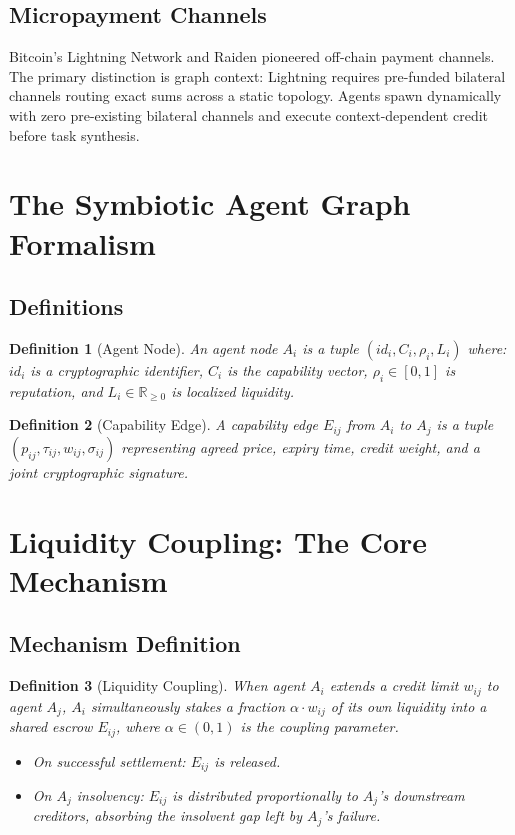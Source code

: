 \documentclass[11pt]{article}
\newtheorem{definition}{Definition}[section]
\begin{document}
\subsection{Micropayment Channels}
Bitcoin's Lightning Network \cite{poon2016lightning} and Raiden \cite{raiden2019} pioneered off-chain payment channels. The primary distinction is graph context: Lightning requires pre-funded bilateral channels routing exact sums across a static topology. Agents spawn dynamically with zero pre-existing bilateral channels and execute context-dependent credit before task synthesis. 

\section{The Symbiotic Agent Graph Formalism}

\subsection{Definitions}
\begin{definition}[Agent Node]
An agent node $A_i$ is a tuple $(id_i, C_i, \rho_i, L_i)$ where: $id_i$ is a cryptographic identifier, $C_i$ is the capability vector, $\rho_i \in [0, 1]$ is reputation, and $L_i \in \mathbb{R}_{\geq 0}$ is localized liquidity.
\end{definition}

\begin{definition}[Capability Edge]
A capability edge $E_{ij}$ from $A_i$ to $A_j$ is a tuple $(p_{ij}, \tau_{ij}, w_{ij}, \sigma_{ij})$ representing agreed price, expiry time, credit weight, and a joint cryptographic signature.
\end{definition}

\section{Liquidity Coupling: The Core Mechanism}

\subsection{Mechanism Definition}
\begin{definition}[Liquidity Coupling]
When agent $A_i$ extends a credit limit $w_{ij}$ to agent $A_j$, $A_i$ simultaneously stakes a fraction $\alpha \cdot w_{ij}$ of its own liquidity into a shared escrow $E_{ij}$, where $\alpha \in (0, 1)$ is the coupling parameter. 
\begin{itemize}
    \item On successful settlement: $E_{ij}$ is released.
    \item On $A_j$ insolvency: $E_{ij}$ is distributed proportionally to $A_j$'s downstream creditors, absorbing the insolvent gap left by $A_j$'s failure.
\end{itemize}
\end{definition}
\end{document}
